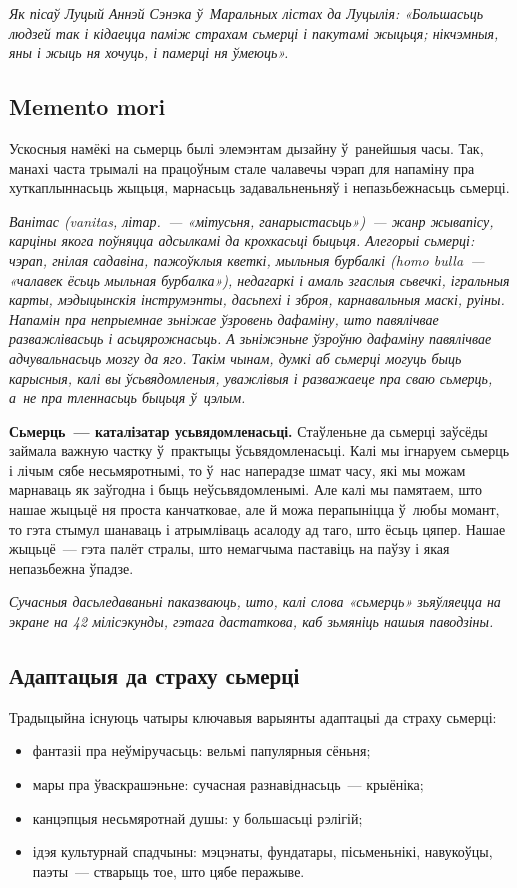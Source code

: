 \emph{Як пісаў Луцый Аннэй Сэнэка ў~Маральных лістах да Луцылія: «Большасьць людзей так і кідаецца паміж страхам сьмерці і пакутамі жыцьця; нікчэмныя, яны і жыць ня хочуць, і памерці ня ўмеюць».}

\subsection*{Memento mori}

Ускосныя намёкі на сьмерць былі элемэнтам дызайну ў~ранейшыя часы. Так, манахі часта трымалі на працоўным стале чалавечы чэрап для напаміну пра хуткаплыннасьць жыцьця, марнасьць задавальненьняў і непазьбежнасьць сьмерці. 

\emph{Ванітас (vanitas, літар.~--- «мітусьня, ганарыстасьць»)~--- жанр жывапісу, карціны якога поўняцца адсылкамі да крохкасьці быцьця. Алегорыі сьмерці: чэрап, гнілая садавіна, пажоўклыя кветкі, мыльныя бурбалкі (homo bulla~--- «чалавек ёсьць мыльная бурбалка»), недагаркі і амаль згаслыя сьвечкі, ігральныя карты, мэдыцынскія інструмэнты, дасьпехі і зброя, карнавальныя маскі, руіны. Напамін пра непрыемнае зьніжае ўзровень дафаміну, што павялічвае разважлівасьць і асьцярожнасьць. А зьніжэньне ўзроўню дафаміну павялічвае адчувальнасьць мозгу да яго. Такім чынам, думкі аб сьмерці могуць быць карысныя, калі вы ўсьвядомленыя, уважлівыя і разважаеце пра сваю сьмерць, а~не пра тленнасьць быцьця ў~цэлым.}

\textbf{Сьмерць~--- каталізатар усьвядомленасьці.} Стаўленьне да сьмерці заўсёды займала важную частку ў~практыцы ўсьвядомленасьці. Калі мы ігнаруем сьмерць і лічым сябе несьмяротнымі, то ў~нас наперадзе шмат часу, які мы можам марнаваць як заўгодна і быць неўсьвядомленымі. Але калі мы памятаем, што нашае жыцьцё ня проста канчатковае, але й можа перапыніцца ў~любы момант, то гэта стымул шанаваць і атрымліваць асалоду ад таго, што ёсьць цяпер. Нашае жыцьцё~--- гэта палёт стралы, што немагчыма паставіць на паўзу і якая непазьбежна ўпадзе.

\emph{Сучасныя дасьледаваньні паказваюць, што, калі слова «сьмерць» зьяўляецца на экране на 42 мілісэкунды, гэтага дастаткова, каб зьмяніць нашыя паводзіны.} 

\subsection*{Адаптацыя да страху сьмерці}

Традыцыйна існуюць чатыры ключавыя варыянты адаптацыі да страху сьмерці: 
\begin{itemize}
  \item фантазіі пра неўміручасьць: вельмі папулярныя сёньня;
  \item мары пра ўваскрашэньне: сучасная разнавіднасьць~--- крыёніка;
  \item канцэпцыя несьмяротнай душы: у большасьці рэлігій;
  \item ідэя культурнай спадчыны: мэцэнаты, фундатары, пісьменьнікі, навукоўцы, паэты~--- стварыць тое, што цябе перажыве.
\end{itemize}

